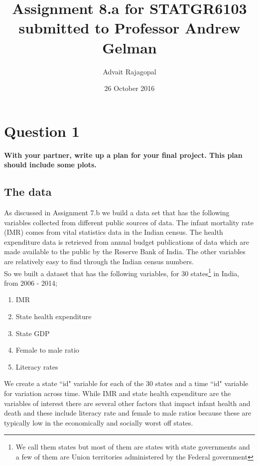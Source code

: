 \documentclass{article}
\title{Assignment 8.a for \textbf{STATGR6103}\\
\large submitted to Professor Andrew Gelman}
\date{26 October 2016}
\author{Advait Rajagopal}
\begin{document}
  \maketitle
\section{Question 1}
\textbf{With your partner, write up a plan for your final project. This plan should include some plots.}
\subsection{The data}
As discussed in Assignment 7.b we build a data set that has the following variables collected from different public sources of data. The infant mortality rate (IMR) comes from vital statistics data in the Indian census. The health expenditure data is retrieved from annual budget publications of data which are made available to the public by the Reserve Bank of India. The other variables are relatively easy to find through the Indian census numbers. \\
So we built a dataset that has the following variables, for 30 states\footnote{We call them states but most of them are states with state governments and a few of them are Union territories administered by the Federal government} in India, from 2006 - 2014;
\begin{enumerate}
\item{IMR}
\item{State health expenditure}
\item{State GDP}
\item{Female to male ratio}
\item{Literacy rates}
\end{enumerate}
We create a state ``id" variable for each of the 30 states and a time ``id" variable for variation across time. While IMR and state health expenditure are the variables of interest there are several other factors that impact infant health and death and these include literacy rate and female to male ratios because these are typically low in the economically and socially worst off states. 
\end{document}

